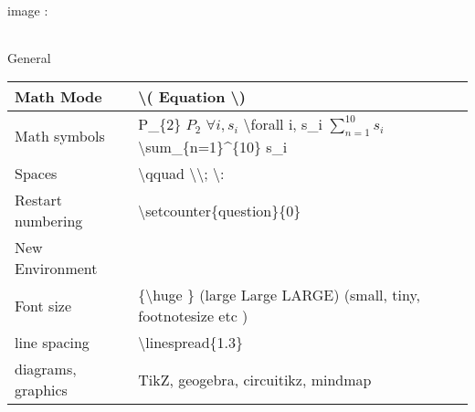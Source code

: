 \begin{enumerate}
     \begin{minipage}{\linewidth}
     \item image :

          \begin{myTableStyle} \begin{tabular}{ |m{14cm}| } \hline
               \\ \hline
          \end{tabular} \end{myTableStyle} \vspace{0.08in}
     \end{minipage}

     \item   General

          \begin{myTableStyle} \begin{tabular}{ |m{4cm}|m{10cm}| } \hline
               Math Mode    &  \textbackslash ( Equation \textbackslash ) \\ \hline
               Math symbols &  P\_\{2\} \(P_{2}\)  \quad
                               \( \forall i, s_i \)  \textbackslash forall i, s\_i  \qquad
                               \( \sum_{n=1}^{10} s_i \)   \textbackslash sum\_\{n=1\}\textasciicircum\{10\} s\_i        \\ \hline

               Spaces  & \textbackslash qquad  \qquad \textbackslash \qquad \textbackslash ; \qquad \textbackslash : \\ \hline

               Restart numbering &  \textbackslash setcounter\{question\}\{0\} \\ \hline

               New Environment &   \\ \hline

               Font size &  \{\textbackslash huge \}   (large Large LARGE) (small, tiny, footnotesize etc ) \\ \hline

               line spacing & \textbackslash linespread\{1.3\} \\ \hline

               diagrams, graphics       &    TikZ, geogebra, circuitikz, mindmap     \\ \hline
          \end{tabular} \end{myTableStyle} \vspace{0.08in}


\end{enumerate}
